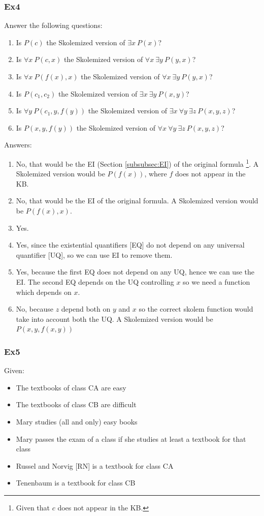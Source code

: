 \documentclass[10pt,a4paper]{article}
\begin{document}
\subsubsection{Ex4}
Answer the following questions:
\begin{enumerate}
\item  Is $P(c)$ the Skolemized version of $\exists x\ P(x)$?
\item  Is $\forall x\ P(c,x)$ the Skolemized version of $\forall x\ \exists y\ P(y,x)$?
\item  Is $\forall x\ P(f(x),x)$ the Skolemized version of $\forall x\ \exists y\ P(y,x)$?
\item  Is $P(c_1,c_2)$ the Skolemized version of $\exists x\ \exists y\ P(x,y)$?
\item  Is $\forall y\ P(c_1,y,f(y))$ the Skolemized version of $\exists x\ \forall y\ \exists z\ P(x,y,z)$?
\item  Is $P(x,y,f(y))$ the Skolemized version of $\forall x\ \forall y\ \exists z\ P(x,y,z)$?
\end{enumerate}

Answers:
\begin{enumerate}
\item No, that would be the EI (Section \ref{subsubsec:EI}) of the original formula \footnote{Given that $c$ does not appear in the KB.}. A Skolemized version would be $P(f(x))$, where $f$ does not appear in the KB.
\item No, that would be the EI of the original formula. A Skolemized version would be $P(f(x),x)$.
\item Yes.
\item Yes, since the existential quantifiers [EQ] do not depend on any universal quantifier [UQ], so we can use EI to remove them.
\item Yes, because the first EQ does not depend on any UQ, hence we can use the EI. The second  EQ depends on the UQ controlling $x$ so we need a function which depends on $x$.
\item No, because $z$ depend both on $y$ and $x$ so the correct skolem function would take into account both the UQ. A Skolemized version would be $P(x,y,f(x,y))$
\end{enumerate}

\subsubsection{Ex5}
Given:
\begin{itemize}
\item The textbooks of class CA are easy
\item The textbooks of class CB are difficult
\item  Mary studies (all and only) easy books
\item  Mary passes the exam of a class if she studies at least a textbook for that class
\item  Russel and Norvig [RN] is a textbook for class CA
\item  Tenenbaum is a textbook for class CB
\end{itemize}
\end{document}
